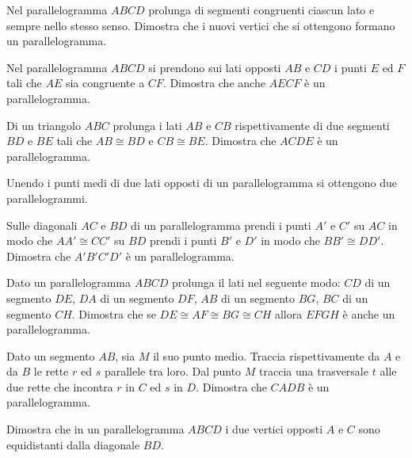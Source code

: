 \begin{multicols}{2}
\begin{esercizio}
\label{ese:4.12}
Nel parallelogramma $ABCD$ prolunga di segmenti congruenti ciascun lato e sempre nello stesso senso. Dimostra che i nuovi vertici che si ottengono formano un parallelogramma.
\end{esercizio}

\begin{esercizio}
\label{ese:4.13}
Nel parallelogramma $ABCD$ si prendono sui lati opposti $AB$ e $CD$ i punti $E$ ed $F$ tali che $AE$ sia congruente a $CF$. Dimostra che anche $AECF$ è un parallelogramma.
\end{esercizio}

\begin{esercizio}
\label{ese:4.14}
Di un triangolo $ABC$ prolunga i lati $AB$ e $CB$ rispettivamente di due segmenti $BD$ e $BE$ tali che $AB\cong BD$ e $CB\cong BE$. Dimostra che $ACDE$ è un parallelogramma.
\end{esercizio}

\begin{esercizio}
\label{ese:4.15}
Unendo i punti medi di due lati opposti di un parallelogramma si ottengono due parallelogrammi.
\end{esercizio}

\begin{esercizio}
\label{ese:4.16}
Sulle diagonali $AC$ e $BD$ di un parallelogramma prendi i punti $A'$ e $C'$ su $AC$ in modo che $AA'\cong CC'$ su $BD$ prendi i punti $B'$ e $D'$ in modo che $BB'\cong DD'$. Dimostra che $A'B'C'D'$ è un parallelogramma.
\end{esercizio}

\begin{esercizio}
\label{ese:4.17}
Dato un parallelogramma $ABCD$ prolunga il lati nel seguente modo: $CD$ di un segmento $DE$, $DA$ di un segmento $DF$, $AB$ di un segmento $BG$, $BC$ di un segmento $CH$. Dimostra che se $DE\cong AF\cong BG\cong CH$ allora $EFGH$ è anche un parallelogramma.
\end{esercizio}

\begin{esercizio}
\label{ese:4.18}
Dato un segmento $AB$, sia $M$ il suo punto medio. Traccia rispettivamente da $A$ e da $B$ le rette $r$ ed $s$ parallele tra loro. Dal punto $M$ traccia una trasversale $t$ alle due rette che incontra $r$ in $C$ ed $s$ in $D$. Dimostra che $CADB$ è un parallelogramma.
\end{esercizio}

\begin{esercizio}
\label{ese:4.19}
Dimostra che in un parallelogramma $ABCD$ i due vertici opposti $A$ e $C$ sono equidistanti dalla diagonale $BD$.
\end{esercizio}


\end{multicols}
